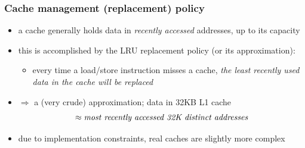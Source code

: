 \documentclass[12pt,dvipdfmx]{beamer}
\newcommand{\ao}[1]{{\color{blue}#1}}
\begin{document}
\begin{frame}
\frametitle{Cache management (replacement) policy}
\begin{itemize}

\item<1-> a cache generally holds data in \ao{\em recently accessed} 
  addresses, up to its capacity

\item<2-> this is accomplished by the \ao{LRU replacement} policy
  (or its approximation):
  \begin{itemize}
  \item every time a load/store instruction misses
    a cache, \ao{\it the least recently used data in the
      cache will be replaced}
  \end{itemize}

\item<3-> $\Rightarrow$ a (very crude) approximation; 
  data in 32KB L1 cache
\[ \approx \mbox{\ao{\em most recently accessed 32K distinct addresses}} \]

\item<4-> due to implementation constraints, real caches are slightly
  more complex
\end{itemize}
\end{frame}
\end{document}
